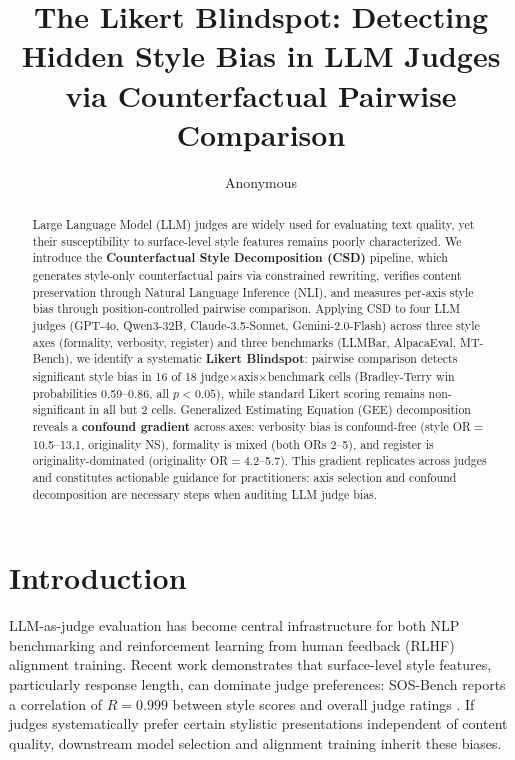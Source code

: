 \documentclass[10pt,twocolumn]{article}
\title{The Likert Blindspot: Detecting Hidden Style Bias in LLM Judges via Counterfactual Pairwise Comparison}
\author{Anonymous}
\date{}
\begin{document}
\maketitle

\begin{abstract}
Large Language Model (LLM) judges are widely used for evaluating text quality, yet their susceptibility to surface-level style features remains poorly characterized.
We introduce the \textbf{Counterfactual Style Decomposition (CSD)} pipeline, which generates style-only counterfactual pairs via constrained rewriting, verifies content preservation through Natural Language Inference (NLI), and measures per-axis style bias through position-controlled pairwise comparison.
Applying CSD to four LLM judges (GPT-4o, Qwen3-32B, Claude-3.5-Sonnet, Gemini-2.0-Flash) across three style axes (formality, verbosity, register) and three benchmarks (LLMBar, AlpacaEval, MT-Bench), we identify a systematic \textbf{Likert Blindspot}: pairwise comparison detects significant style bias in 16 of 18 judge$\times$axis$\times$benchmark cells (Bradley-Terry win probabilities 0.59--0.86, all $p<0.05$), while standard Likert scoring remains non-significant in all but 2 cells.
Generalized Estimating Equation (GEE) decomposition reveals a \textbf{confound gradient} across axes: verbosity bias is confound-free (style OR$=$10.5--13.1, originality NS), formality is mixed (both ORs 2--5), and register is originality-dominated (originality OR$=$4.2--5.7).
This gradient replicates across judges and constitutes actionable guidance for practitioners: axis selection and confound decomposition are necessary steps when auditing LLM judge bias.
\end{abstract}

\section{Introduction}

LLM-as-judge evaluation has become central infrastructure for both NLP benchmarking and reinforcement learning from human feedback (RLHF) alignment training.
Recent work demonstrates that surface-level style features, particularly response length, can dominate judge preferences: SOS-Bench reports a correlation of $R=0.999$ between style scores and overall judge ratings \citep{sosbench2025}.
If judges systematically prefer certain stylistic presentations independent of content quality, downstream model selection and alignment training inherit these biases.
\end{document}
